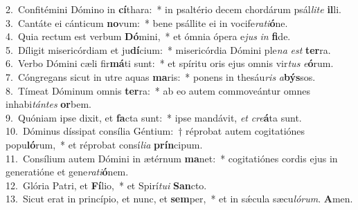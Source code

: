 {2.~}Confitémini Dómino in \textbf{cí}thara:~* in psaltério decem chordárum psál\textit{li}\textit{te} \textbf{il}li.\\
{3.~}Cantáte ei cánticum \textbf{no}vum:~* bene psállite ei in vocife\textit{ra}\textit{ti}\textbf{ó}ne.\\
{4.~}Quia rectum est verbum \textbf{Dó}mini,~* et ómnia ópera e\textit{jus} \textit{in} \textbf{fi}de.\\
{5.~}Díligit misericórdiam et ju\textbf{dí}cium:~* misericórdia Dómini ple\textit{na} \textit{est} \textbf{ter}ra.\\
{6.~}Verbo Dómini cæli fir\textbf{má}ti sunt:~* et spíritu oris ejus omnis vir\textit{tus} \textit{e}\textbf{ó}rum.\\
{7.~}Cóngregans sicut in utre aquas \textbf{ma}ris:~* ponens in thesáu\textit{ris} \textit{a}\textbf{býs}sos.\\
{8.~}Tímeat Dóminum omnis \textbf{ter}ra:~* ab eo autem commoveántur omnes inhabi\textit{tán}\textit{tes} \textbf{or}bem.\\
{9.~}Quóniam ipse dixit, et \textbf{fa}cta sunt:~* ipse mandávit, \textit{et} \textit{cre}\textbf{á}ta sunt.\\
{10.~}Dóminus díssipat consília Géntium:~† réprobat autem cogitatiónes popu\textbf{ló}rum,~* et réprobat consí\textit{li}\textit{a} \textbf{prín}cipum.\\
{11.~}Consílium autem Dómini in ætérnum \textbf{ma}net:~* cogitatiónes cordis ejus in generatióne et gene\textit{ra}\textit{ti}\textbf{ó}nem.\\
{12.~}Glória Patri, et \textbf{Fí}lio,~* et Spirí\textit{tu}\textit{i} \textbf{San}cto.\\
{13.~}Sicut erat in princípio, et nunc, et \textbf{sem}per,~* et in sǽcula sæcu\textit{ló}\textit{rum}. \textbf{A}men.\\

